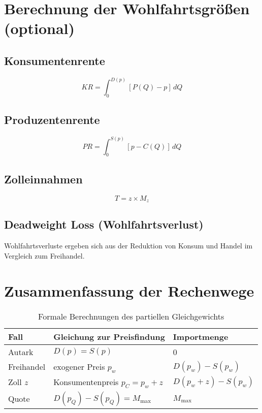 \section{Berechnung der Wohlfahrtsgrößen (optional)}

\subsection*{Konsumentenrente}
\[
KR = \int_0^{D(p)} \left[P(Q) - p \right] \, dQ
\]

\subsection*{Produzentenrente}
\[
PR = \int_0^{S(p)} \left[p - C(Q) \right] \, dQ
\]

\subsection*{Zolleinnahmen}
\[
T = z \times M_z
\]

\subsection*{Deadweight Loss (Wohlfahrtsverlust)}
Wohlfahrtsverluste ergeben sich aus der Reduktion von Konsum und Handel im Vergleich zum Freihandel.

\section{Zusammenfassung der Rechenwege}

\begin{table}[h!]
\centering
\begin{tabular}{@{}lll@{}}
\toprule
Fall & Gleichung zur Preisfindung & Importmenge \\ \midrule
Autark       & \( D(p) = S(p) \)                            & 0                         \\
Freihandel   & exogener Preis \( p_w \)                     & \( D(p_w) - S(p_w) \)     \\
Zoll \( z \) & Konsumentenpreis \( p_C = p_w + z \)         & \( D(p_w + z) - S(p_w) \) \\
Quote        & \( D(p_Q) - S(p_Q) = M_{\text{max}} \)       & \( M_{\text{max}} \)      \\ \bottomrule
\end{tabular}
\caption{Formale Berechnungen des partiellen Gleichgewichts}
\end{table}

